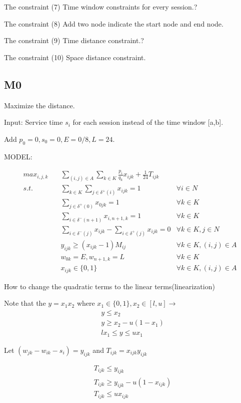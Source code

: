 The constraint (7) Time window constraints for every session.?

The constraint (8) Add two node indicate the start node and end node.

The constraint (9) Time distance constraint.?

The constraint (10) Space distance constraint.


\subsection{M0}
Maximize the distance.

Input: Service time $s_i$ for each session instead of the time window [a,b].

Add $p_0 = 0, s_0 = 0, E = 0/8, L=24.$

MODEL:


\begin{align}
max_{i,j,k} \quad & \sum_{(i,j) \in A} \sum_{k \in K} \frac{p_i}{q_k} x_{ijk} + \frac{1}{24} T_{ijk} \\
s.t. \quad  & \sum_{k \in K} \sum_{j \in \delta^+ (i)} x_{ijk} =1 & \forall i \in N  \\
& \sum_{j \in \delta^+ (0)} x_{0jk} =1 & \forall k \in K \\
& \sum_{i \in \delta^- (n+1)} x_{i,n+1,k} =1 & \forall k \in K \\
& \sum_{i \in \delta^- (j)} x_{ijk} - \sum_{i \in \delta^+ (j)} x_{ijk} = 0  & \forall k \in K, j \in N \\
& y_{ijk} \geq (x_{ijk}-1) M_{ij} & \forall k \in K, (i,j) \in A \\
& w_{0k}=E, w_{n+1,k}=L  & \forall k \in K \\
& x_{ijk} \in \{0,1\} & \forall k \in K, (i,j) \in A
\end{align}

How to change the quadratic terms to the linear terms(linearization)

Note that the
$y =x_1 x_2$  where $x_1 \in \{0,1\}, x_2 \in [l,u] \to$
$$
\begin{aligned}
& y \leq x_2 \\
& y \geq x_2 - u(1-x_1)    \\
& l x_1 \leq y \leq u x_1
\end{aligned}$$

Let $(w_{jk}-w_{ik}-s_i) = y_{ijk}$ and $T_{ijk} = x_{ijk} y_{ijk}$


$$
\begin{aligned}
& T_{ijk} \leq y_{ijk} \\
& T_{ijk} \geq y_{ijk} - u(1-x_{ijk})    \\
& T_{ijk} \leq u x_{ijk}
\end{aligned}$$

